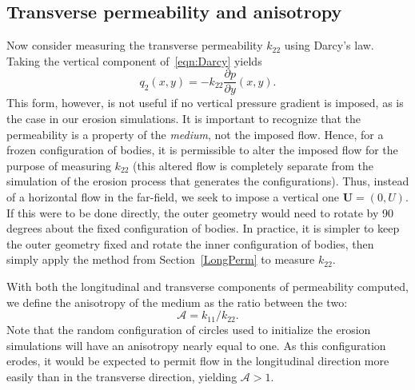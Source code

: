 \documentclass[3p]{elsarticle}
\newcommand{\UU}{{\mathbf{U}}}
\newcommand{\pderiv}[2]{\frac{\partial #1}{\partial #2}}
\newcommand{\anis}{\mathcal{A}}
\begin{document}
\subsection{Transverse permeability and anisotropy}
\label{subsec:anis}

Now consider measuring the transverse permeability $k_{22}$ using Darcy's law. Taking the vertical component of~\eqref{eqn:Darcy} yields
\begin{equation}
  \label{q2}
  q_2(x,y) = -k_{22} \pderiv{p}{y}(x,y).
\end{equation}
This form, however, is not useful if no vertical pressure gradient is imposed, as is the case in our erosion simulations. It is important to recognize that the permeability is a property of the {\em medium}, not the imposed flow. Hence, for a frozen configuration of bodies, it is permissible to alter the imposed flow for the purpose of measuring $k_{22}$ (this altered flow is completely separate from the simulation of the erosion process that generates the configurations). Thus, instead of a horizontal flow in the far-field, we seek to impose a vertical one $\UU = (0,U)$. If this were to be done directly, the outer geometry would need to rotate by 90 degrees about the fixed configuration of bodies. In practice, it is simpler to keep the outer geometry fixed and rotate the inner configuration of bodies, then simply apply the method from Section~\ref{LongPerm} to measure $k_{22}$.

With both the longitudinal and transverse components of permeability computed, we define the anisotropy of the medium as the ratio between the two:
\begin{equation}
  \label{eq:anis}
  \anis = k_{11} / k_{22}.
\end{equation}
Note that the random configuration of circles used to initialize the erosion simulations will have an anisotropy nearly equal to one. As this configuration erodes, it would be expected to permit flow in the longitudinal direction more easily than in the transverse direction, yielding $\anis > 1$.
\end{document}

